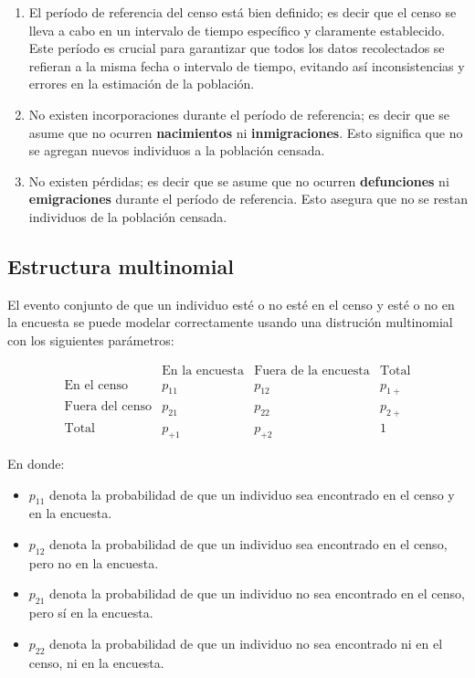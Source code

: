 \documentclass[
  12pt,
]{book}
\providecommand{\tightlist}{%
  \setlength{\itemsep}{0pt}\setlength{\parskip}{0pt}}
\begin{document}
\begin{enumerate}
\def\labelenumi{\arabic{enumi}.}
\item
  El período de referencia del censo está bien definido; es decir que el censo se lleva a cabo en un intervalo de tiempo específico y claramente establecido. Este período es crucial para garantizar que todos los datos recolectados se refieran a la misma fecha o intervalo de tiempo, evitando así inconsistencias y errores en la estimación de la población.
\item
  No existen incorporaciones durante el período de referencia; es decir que se asume que no ocurren \textbf{nacimientos} ni \textbf{inmigraciones}. Esto significa que no se agregan nuevos individuos a la población censada.
\item
  No existen pérdidas; es decir que se asume que no ocurren \textbf{defunciones} ni \textbf{emigraciones} durante el período de referencia. Esto asegura que no se restan individuos de la población censada.
\end{enumerate}

\hypertarget{estructura-multinomial}{%
\subsection{Estructura multinomial}\label{estructura-multinomial}}

El evento conjunto de que un individuo esté o no esté en el censo y esté o no en la encuesta se puede modelar correctamente usando una distrución multinomial con los siguientes parámetros:

\[
    \begin{array}{c|cc|c}
    & \text{En la encuesta} & \text{Fuera de la encuesta} & \text{Total} \\
    \hline
    \text{En el censo} & p_{11} & p_{12} & p_{1+} \\
    \text{Fuera del censo} & p_{21} & p_{22} & p_{2+} \\
    \hline
    \text{Total} & p_{+1} & p_{+2} & 1
    \end{array}
    \]

En donde:

\begin{itemize}
\tightlist
\item
  \(p_{11}\) denota la probabilidad de que un individuo sea encontrado en el censo y en la encuesta.
\item
  \(p_{12}\) denota la probabilidad de que un individuo sea encontrado en el censo, pero no en la encuesta.
\item
  \(p_{21}\) denota la probabilidad de que un individuo no sea encontrado en el censo, pero sí en la encuesta.
\item
  \(p_{22}\) denota la probabilidad de que un individuo no sea encontrado ni en el censo, ni en la encuesta.
\end{itemize}
\end{document}
